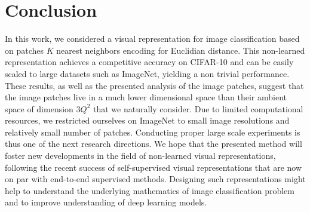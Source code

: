 \documentclass{article} %
\begin{document}
\section{Conclusion}

In this work, we considered a visual representation for image classification based on patches $K$ nearest neighbors encoding for Euclidian distance.
This non-learned representation achieves a competitive accuracy on CIFAR-10 and can be easily scaled to large datasets such as ImageNet, yielding a non trivial performance.
These results, as well as the presented analysis of the image patches, suggest that the image patches live in a much lower dimensional space than their ambient space of dimension $3Q^2$ that we naturally consider.
Due to limited computational resources, we restricted ourselves on ImageNet to small image resolutions and  relatively small number of patches. 
Conducting proper large scale experiments is thus one of the next research directions.
We hope that the presented method will foster new developments in the field of non-learned visual representations, following the recent success  of  self-supervised visual representations that are now on par with end-to-end supervised methods.
Designing such representations might help to understand the underlying mathematics of image classification problem and to improve understanding of deep learning models.




\end{document}
